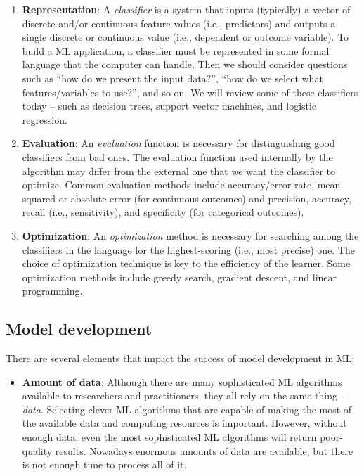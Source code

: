 \documentclass[]{book}
\providecommand{\tightlist}{%
  \setlength{\itemsep}{0pt}\setlength{\parskip}{0pt}}
\begin{document}
\begin{enumerate}
\def\labelenumi{\arabic{enumi}.}
\item
  \textbf{Representation}: A \emph{classifier} is a system that inputs (typically) a vector of discrete and/or continuous feature values (i.e., predictors) and outputs a single discrete or continuous value (i.e., dependent or outcome variable). To build a ML application, a classifier must be represented in some formal language that the computer can handle. Then we should consider questions such as ``how do we present the input data?'', ``how do we select what features/variables to use?'', and so on. We will review some of these classifiers today -- such as decision trees, support vector machines, and logistic regression.
\item
  \textbf{Evaluation}: An \emph{evaluation} function is necessary for distinguishing good classifiers from bad ones. The evaluation function used internally by the algorithm may differ from the external one that we want the classifier to optimize. Common evaluation methods include accuracy/error rate, mean squared or absolute error (for continuous outcomes) and precision, accuracy, recall (i.e., sensitivity), and specificity (for categorical outcomes).
\item
  \textbf{Optimization}: An \emph{optimization} method is necessary for searching among the classifiers in the language for the highest-scoring (i.e., most precise) one. The choice of optimization technique is key to the efficiency of the learner. Some optimization methods include greedy search, gradient descent, and linear programming.
\end{enumerate}

\hypertarget{model-development}{%
\subsection{Model development}\label{model-development}}

There are several elements that impact the success of model development in ML:

\begin{itemize}
\tightlist
\item
  \textbf{Amount of data}: Although there are many sophisticated ML algorithms available to researchers and practitioners, they all rely on the same thing -- \emph{data}. Selecting clever ML algorithms that are capable of making the most of the available data and computing resources is important. However, without enough data, even the most sophisticated ML algorithms will return poor-quality results. Nowadays enormous amounts of data are available, but there is not enough time to process all of it.
\end{itemize}
\end{document}
